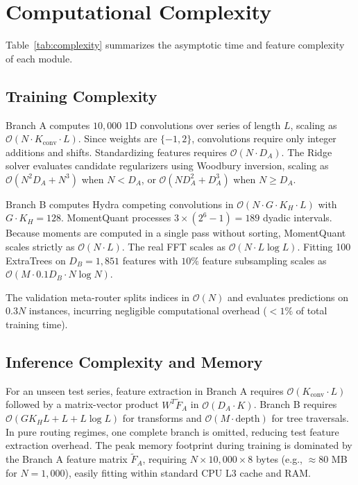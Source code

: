 \documentclass[journal,twocolumn]{article}
\begin{document}


\section{Computational Complexity}
Table~\ref{tab:complexity} summarizes the asymptotic time and feature complexity of each module.

\subsection{Training Complexity}
Branch A computes $10,000$ 1D convolutions over series of length $L$, scaling as $\mathcal{O}(N \cdot K_{\text{conv}} \cdot L)$. Since weights are $\{-1, 2\}$, convolutions require only integer additions and shifts. Standardizing features requires $\mathcal{O}(N \cdot D_A)$. The Ridge solver evaluates candidate regularizers using Woodbury inversion, scaling as $\mathcal{O}(N^2 D_A + N^3)$ when $N < D_A$, or $\mathcal{O}(N D_A^2 + D_A^3)$ when $N \ge D_A$.

Branch B computes Hydra competing convolutions in $\mathcal{O}(N \cdot G \cdot K_H \cdot L)$ with $G \cdot K_H = 128$. MomentQuant processes $3 \times (2^6 - 1) = 189$ dyadic intervals. Because moments are computed in a single pass without sorting, MomentQuant scales strictly as $\mathcal{O}(N \cdot L)$. The real FFT scales as $\mathcal{O}(N \cdot L \log L)$. Fitting 100 ExtraTrees on $D_B = 1,851$ features with $10\%$ feature subsampling scales as $\mathcal{O}(M \cdot 0.1 D_B \cdot N \log N)$.

The validation meta-router splits indices in $\mathcal{O}(N)$ and evaluates predictions on $0.3N$ instances, incurring negligible computational overhead ($< 1\%$ of total training time).

\subsection{Inference Complexity and Memory}
For an unseen test series, feature extraction in Branch A requires $\mathcal{O}(K_{\text{conv}} \cdot L)$ followed by a matrix-vector product $W^T \tilde{F}_A$ in $\mathcal{O}(D_A \cdot K)$. Branch B requires $\mathcal{O}(G K_H L + L + L \log L)$ for transforms and $\mathcal{O}(M \cdot \text{depth})$ for tree traversals. In pure routing regimes, one complete branch is omitted, reducing test feature extraction overhead. The peak memory footprint during training is dominated by the Branch A feature matrix $\tilde{F}_A$, requiring $N \times 10,000 \times 8$ bytes (e.g., $\approx 80$ MB for $N=1,000$), easily fitting within standard CPU L3 cache and RAM.
\end{document}
